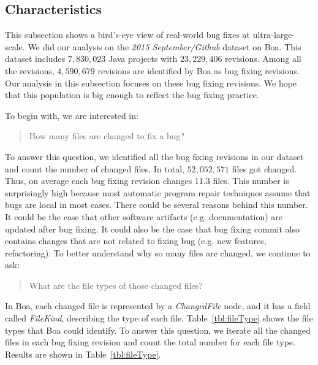 \documentclass{sig-alternate-05-2015}
\begin{document}
\subsection{Characteristics}

This subsection shows a bird's-eye view of real-world bug fixes at
ultra-large-scale. We did our analysis on the \emph{2015 September/Github}
dataset on Boa. This dataset includes $7,830,023$ Java projects with
$23,229,406$ revisions. Among all the revisions, $4,590,679$ revisions are
identified by Boa as bug fixing revisions. Our analysis in this subsection
focuses on these bug fixing revisions. We hope that this population
is big enough to reflect the bug fixing practice.

To begin with, we are interested in:

\begin{quote}
	How many files are changed to fix a bug?
\end{quote}

To answer this question, we identified all the bug fixing revisions in our
dataset and count the number of changed files. In total, $52,052,571$ files got
changed. Thus, on average each bug fixing revision changes 11.3 files.  This
number is surprisingly high because most automatic program repair techniques
assume that bugs are local in most cases. There could be several reasons behind
this number. It could be the case that other software artifacts (e.g.
documentation) are updated after bug fixing. It could also be the case that bug
fixing commit also contains changes that are not related to fixing bug (e.g. new
features, refactoring). To better understand why so many files are changed, we
continue to ask:

\begin{quote}
	What are the file types of those changed files?
\end{quote}

In Boa, each changed file is represented by a \emph{ChangedFile} node, and it
has a field called \emph{FileKind}, describing the type of each file.
Table~\ref{tbl:fileType} shows the file types that Boa could identify. To answer
this question, we iterate all the changed files in each bug fixing revision and
count the total number for each file type. Results are shown in
Table~\ref{tbl:fileType}.
\end{document}
